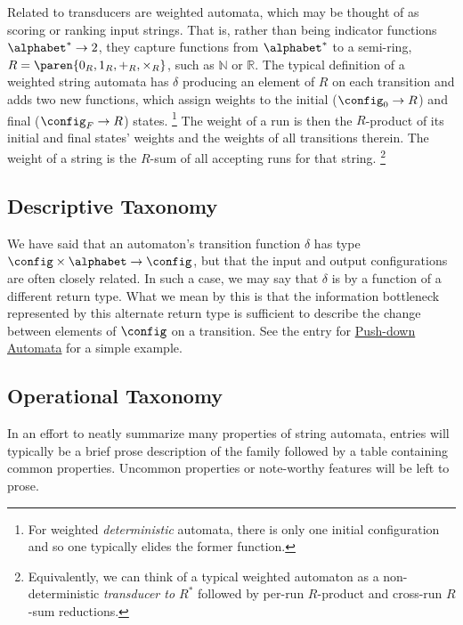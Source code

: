 Related to transducers are weighted automata, which may be thought of as
scoring or ranking input strings.  That is, rather than being indicator
functions $\alphabet^* \to 2$, they capture functions from $\alphabet^*$ to a
semi-ring, $R = \paren{0_R, 1_R, +_R, \times_R}$, such as $\mathbb{N}$ or
$\mathbb{R}$.  The typical definition of a weighted string automata has
$\delta$ producing an element of $R$ on each transition and adds two new
functions, which assign weights to the initial ($\config_0 \to R$) and
final ($\config_F \to R$) states.%
%
\footnote{For weighted {\em deterministic} automata, there is only one
initial configuration and so one typically elides the former function.}
%
The weight of a run is then the
$R$-product of its initial and final states' weights and the weights of all
transitions therein.  The weight of a string is the $R$-sum of all accepting
runs for that string.%
%
\footnote{Equivalently, we can think of a typical weighted automaton as a
non-deterministic {\em transducer to $R^*$} followed by per-run $R$-product
and cross-run $R$-sum reductions.}

\subsection{Descriptive Taxonomy}

We have said that an automaton's transition function $\delta$ has type
$\config \times \alphabet \to \config$, but that the input and output
configurations are often closely related.  In such a case, we may say that
$\delta$ is  by a function of a different return
type.  What we mean by this is that the information bottleneck represented
by this alternate return type is sufficient to describe the change between
elements of $\config$ on a transition.  See the entry for
\hyperref[sec:zoo-str/pda]{Push-down Automata} for a simple example.

\subsection{Operational Taxonomy}

In an effort to neatly summarize many properties of string automata, entries
will typically be a brief prose description of the family followed by a
table containing common properties.  Uncommon properties or note-worthy
features will be left to prose.

